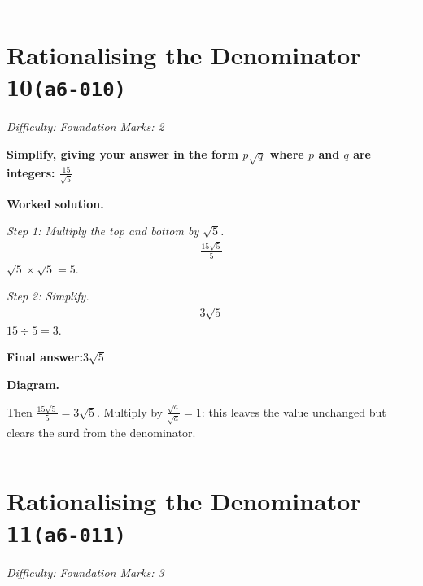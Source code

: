 \documentclass[11pt]{article}
\newcommand{\question}[1]{\par\medskip\noindent\textbf{#1}\par}
\begin{document}
\medskip\hrule

\section*{Rationalising the Denominator 10\quad\small\texttt{(a6-010)}}
\textit{Difficulty: Foundation \quad\textbar\quad Marks: 2}

\question{Simplify, giving your answer in the form \( p\sqrt{q} \) where \( p \) and \( q \) are integers: \( \frac{15}{\sqrt{5}} \)}

\textbf{Worked solution.}

\textit{Step 1: Multiply the top and bottom by \( \sqrt{5} \).}
\[\begin{gathered}
\frac{15\sqrt{5}}{5}
\end{gathered}\]
\( \sqrt{5} \times \sqrt{5} = 5 \).

\textit{Step 2: Simplify.}
\[\begin{gathered}
3\sqrt{5}
\end{gathered}\]
\( 15 \div 5 = 3 \).

\begin{answerbox}
\textbf{Final answer:}\quad \(\displaystyle 3\sqrt{5}\)
\end{answerbox}
\textbf{Diagram.}

\begin{center}
\end{center}
\small Then $\frac{15\sqrt5}{5}=3\sqrt5$. Multiply by $\frac{\sqrt{a}}{\sqrt{a}}=1$: this leaves the value unchanged but clears the surd from the denominator.\normalsize

\medskip\hrule

\section*{Rationalising the Denominator 11\quad\small\texttt{(a6-011)}}
\textit{Difficulty: Foundation \quad\textbar\quad Marks: 3}
\end{document}
